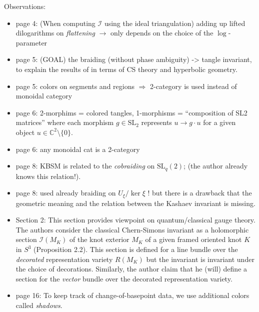 \documentclass[11pt]{amsart}
\begin{document}
Observations:
\begin{itemize}
    \item page 4: (When computing $\mathcal{I}$ using the ideal triangulation) adding up lifted dilogarithms on \textit{flattening} $\rightarrow$ only depends on the choice of the $\log$-parameter
    \item page 5: (GOAL) the braiding (without phase ambiguity) -> tangle invariant, to explain the results of \cite{McPhailSnyder_Reshetikhin-2025-cyclic_modules} in terms of CS theory and hyperbolic geometry.
    \item page 5: colors on segments and regions $\Rightarrow$ 2-category is used instead of monoidal category
    \item page 6: 2-morphims = colored tangles, 1-morphisms = ``composition of SL2 matrices'' where each morphism $g \in \mathrm{SL}_2$ represents $u \rightarrow g\cdot u$ for a given object $u \in \mathbb{C}^2 \setminus \{ 0\}$.
    \item page 6: any monoidal cat is a 2-category
    \item page 8: KBSM is related to the \textit{cobraiding} on $\mathrm{SL}_q(2)$; (the author already knows this relation!).
    \item page 8: \cite{Chen_McPhailSnyder_Morrison_Snyder-2021-Kashaev_Reshetikhin} used already braiding on \( U_\xi / \ker{\xi} \) ! but there is a drawback that the geometric meaning and the relation between the Kashaev invariant is missing.
    \item Section 2: 
    This section provides viewpoint on quantum/classical gauge theory.
    The authors consider the classical Chern-Simons invariant as a holomorphic section $\mathcal{I}(M_K)$ of the knot exterior $M_K$ of a given framed oriented knot $K$ in $S^3$ (Proposition 2.2).
    This section is defined for a line bundle over the \textit{decorated} representation variety $R(M_K)$ but the invariant is invariant under the choice of decorations.
    Similarly, the author claim that he (will) define a section for the \textit{vector} bundle over the decorated representation variety.
    \item page 16: To keep track of change-of-basepoint data, we use additional colors called \emph{shadows}.
\end{itemize}
\end{document}
